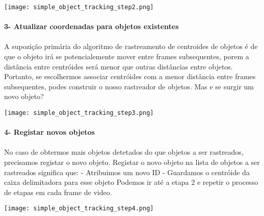 \begin{center}
  \texttt{[image: simple\_object\_tracking\_step2.png]}
  \label{img:centroid_traking2}  
\end{center}

\paragraph{3- Atualizar coordenadas para objetos existentes}
\paragraph{}
A supozição primária do algoritmo de rastreamento de centroides de objetos é de que o objeto irá se potencialemente mover entre frames subsequentes, porem a distância entre centróides será menor que outras distâncias entre objetos.
\newline
Portanto, se escolhermos associar centróides com a menor distância entre frames subsequentes, podes construir o nosso rastreador de objetos.
\newline
Mas e se surgir um novo objeto? 

\begin{center}
  \texttt{[image: simple\_object\_tracking\_step3.png]}
  \label{img:centroid_traking3}  
\end{center}


\paragraph{4- Registar novos objetos}
\paragraph{}
No caso de obtermos mais objetos detetados do que objetos a ser rastreados, precisamos registar o novo objeto. Registar o novo objeto na lista de objetos a ser rastreados significa que: 
\newline - Atribuimos um novo ID
\newline - Guardamos o centróide da caixa delimitadora para esse objeto
\newline
Podemos ir até a etapa 2 e repetir o processo de etapas em cada frame de video.

\begin{center}
  \texttt{[image: simple\_object\_tracking\_step4.png]}
  \label{img:centroid_traking4}  
\end{center}



